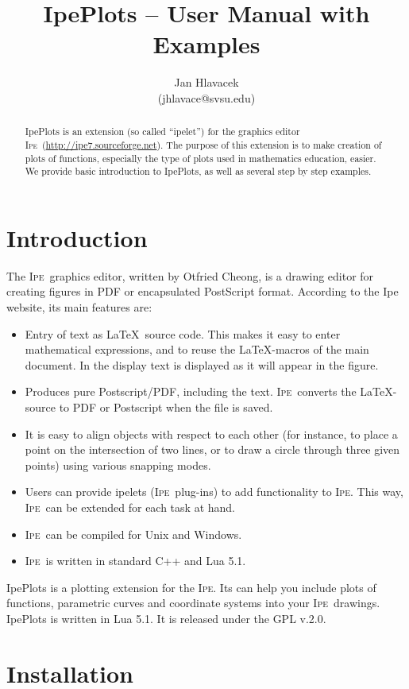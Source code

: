\documentclass{article}
\title{IpePlots -- User Manual with Examples}
\author{Jan Hlavacek\\(jhlavace@svsu.edu)}
\def\Ipe{\textsc{Ipe}}
\begin{document}
\maketitle
\tableofcontents
\begin{abstract}
   IpePlots is an extension (so called ``ipelet'') for the graphics editor \Ipe\
   (\url{http://ipe7.sourceforge.net}).  The purpose of this extension is to
   make creation of plots of functions, especially the type of plots used in
   mathematics education, easier.  We provide basic introduction to IpePlots,
   as well as several step by step examples. 
\end{abstract}

\section{Introduction}
The \Ipe\ graphics editor, written by Otfried Cheong, is a drawing editor for
creating figures in PDF or encapsulated PostScript format. According to the Ipe
website\cite{ipeweb}, its main features are:
\begin{itemize}
   \item Entry of text as \LaTeX\ source code. This makes it easy to enter
      mathematical expressions, and to reuse the \LaTeX-macros of the main
      document. In the display text is displayed as it will appear in the
      figure.
   \item Produces pure Postscript/PDF, including the text. \Ipe\ converts the \LaTeX-source to PDF or Postscript when the file is saved.
   \item  It is easy to align objects with respect to each other (for instance,
      to place a point on the intersection of two lines, or to draw a circle
      through three given points) using various snapping modes.
   \item  Users can provide ipelets (\Ipe\ plug-ins) to add functionality to
      \Ipe. This way, \Ipe\ can be extended for each task at hand.
   \item  \Ipe\ can be compiled for Unix and Windows.
   \item  \Ipe\ is written in standard C++ and Lua 5.1. 
\end{itemize}
IpePlots is a plotting extension for the \Ipe. Its can help you include plots
of functions, parametric curves and coordinate systems into your \Ipe\
drawings.  IpePlots is written in Lua 5.1.  It is released under the GPL v.2.0.

\section{Installation}
\end{document}
